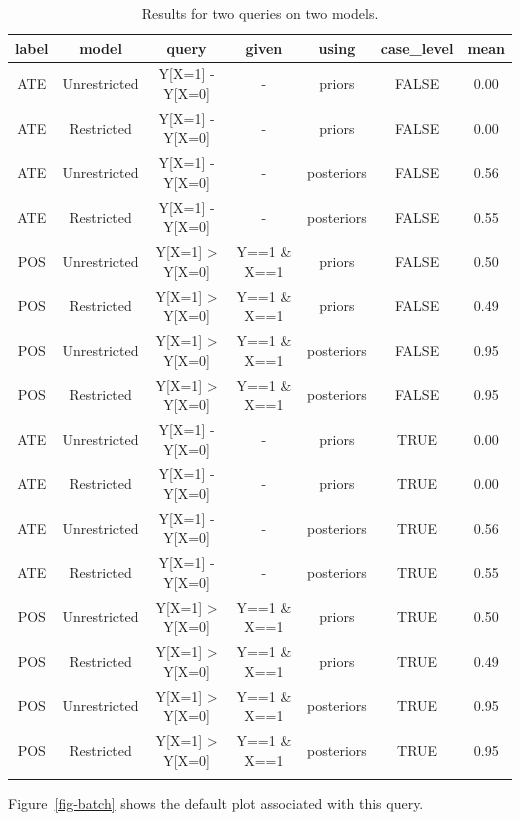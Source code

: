 \documentclass[
  11pt,
  article]{jss}
\begin{document}
\begin{longtable}{ccccccc}

\toprule
label & model & query & given & using & case\_level & mean\\
\midrule
ATE & Unrestricted & Y[X=1] - Y[X=0] & - & priors & FALSE & 0.00\\
ATE & Restricted & Y[X=1] - Y[X=0] & - & priors & FALSE & 0.00\\
ATE & Unrestricted & Y[X=1] - Y[X=0] & - & posteriors & FALSE & 0.56\\
ATE & Restricted & Y[X=1] - Y[X=0] & - & posteriors & FALSE & 0.55\\
POS & Unrestricted & Y[X=1] > Y[X=0] & Y==1 \& X==1 & priors & FALSE & 0.50\\
POS & Restricted & Y[X=1] > Y[X=0] & Y==1 \& X==1 & priors & FALSE & 0.49\\
POS & Unrestricted & Y[X=1] > Y[X=0] & Y==1 \& X==1 & posteriors & FALSE & 0.95\\
POS & Restricted & Y[X=1] > Y[X=0] & Y==1 \& X==1 & posteriors & FALSE & 0.95\\
ATE & Unrestricted & Y[X=1] - Y[X=0] & - & priors & TRUE & 0.00\\
ATE & Restricted & Y[X=1] - Y[X=0] & - & priors & TRUE & 0.00\\
ATE & Unrestricted & Y[X=1] - Y[X=0] & - & posteriors & TRUE & 0.56\\
ATE & Restricted & Y[X=1] - Y[X=0] & - & posteriors & TRUE & 0.55\\
POS & Unrestricted & Y[X=1] > Y[X=0] & Y==1 \& X==1 & priors & TRUE & 0.50\\
POS & Restricted & Y[X=1] > Y[X=0] & Y==1 \& X==1 & priors & TRUE & 0.49\\
POS & Unrestricted & Y[X=1] > Y[X=0] & Y==1 \& X==1 & posteriors & TRUE & 0.95\\
POS & Restricted & Y[X=1] > Y[X=0] & Y==1 \& X==1 & posteriors & TRUE & 0.95\\
\bottomrule


\caption{\label{tbl-batch-query}Results for two queries on two models.}

\tabularnewline
\end{longtable}

Figure~\ref{fig-batch} shows the default plot associated with this
query.
\end{document}
